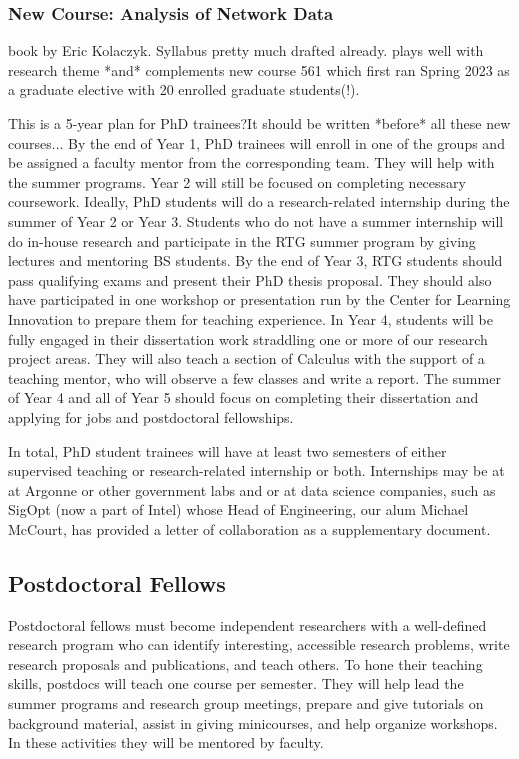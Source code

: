 \documentclass[11pt]{NSFamsart}
\begin{document}
\subsubsection*{New Course: Analysis of Network Data}
book by Eric Kolaczyk. Syllabus pretty much drafted already. plays well with  research theme *and*  complements  new course 561 which first ran Spring 2023 as a graduate elective with 20 enrolled graduate students(!). 

{\color{cyan}This is a 5-year plan for PhD  trainees?It should be written *before* all these new courses...}
By the end of Year 1, PhD trainees will enroll in one of the groups and be assigned a faculty mentor from the corresponding team. They will   help with the summer programs.   Year 2
will still be focused on completing necessary coursework.
Ideally, PhD students will do a research-related internship during the summer of Year 2 or Year 3. Students who do not have
a summer internship will do in-house research and participate in the RTG summer program
by giving lectures and mentoring BS students. By the end of Year 3, RTG students
should pass qualifying exams and present their PhD thesis proposal. They should also have participated in one   workshop or presentation run by the Center for Learning Innovation to prepare them for teaching experience. In Year 4, students will be fully engaged in their dissertation work straddling one or more of our research project areas. They will also teach a section of Calculus with the support of a teaching
mentor, who will observe a few classes and write a report. The summer of Year 4 and all of Year 5 should focus on completing their dissertation and applying for jobs and postdoctoral fellowships.

In total, PhD student trainees will have at least two semesters of either supervised teaching or research-related internship or both.  Internships may be at at Argonne or other government labs and or at data science companies, such as SigOpt (now a part of Intel) whose Head of Engineering, our alum Michael McCourt, has provided a letter  of collaboration as a supplementary document. 

\subsection*{Postdoctoral Fellows}
Postdoctoral fellows must become independent researchers with a well-defined research program who can identify interesting, accessible research problems, write research proposals and publications, and teach others.  To hone their teaching skills, postdocs will teach one course per semester. They will help lead the summer programs and research group meetings, prepare and give tutorials on background material, assist in giving minicourses, and help organize workshops.  In these activities they will be mentored by faculty.
\end{document}
